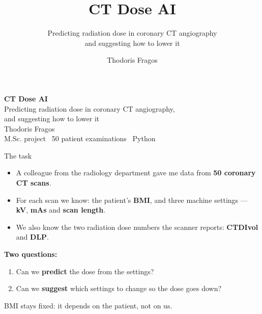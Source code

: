 \documentclass[aspectratio=169,11pt]{beamer}
\title{CT Dose AI}
\subtitle{Predicting radiation dose in coronary CT angiography\\and suggesting how to lower it}
\author{Thodoris Fragos}
\date{}
\begin{document}
\begin{frame}[plain]
  \vspace{10mm}
  {\color{mydark}\Huge\bfseries CT Dose AI}\\[6mm]
  {\large Predicting radiation dose in coronary CT angiography,\\[1mm]
  and suggesting how to lower it}\\[12mm]
  {\color{mygrey} Thodoris Fragos \\[1mm]
  M.Sc. project \textbullet\ 50 patient examinations \textbullet\ Python}
  \vfill
\end{frame}

\begin{frame}{The task}
\begin{itemize}\itemsep8pt
  \item A colleague from the radiology department gave me data from \textbf{50 coronary CT scans}.
  \item For each scan we know: the patient's \textbf{BMI}, and three machine settings --- \textbf{kV}, \textbf{mAs}
  and \textbf{scan length}.
  \item We also know the two radiation dose numbers the scanner reports: \textbf{CTDIvol} and \textbf{DLP}.
\end{itemize}
\vspace{6mm}
\textbf{Two questions:}
\begin{enumerate}\itemsep6pt
  \item Can we \textbf{predict} the dose from the settings?
  \item Can we \textbf{suggest} which settings to change so the dose goes down?
\end{enumerate}
\vspace{4mm}
{\color{mygrey}BMI stays fixed: it depends on the patient, not on us.}
\end{frame}
\end{document}
